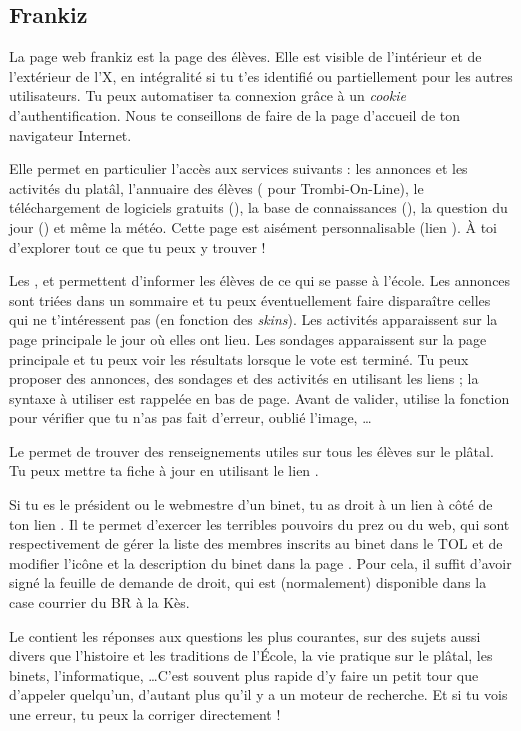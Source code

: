 \subsection{Frankiz}
\label{frankiz} La page web frankiz est la page des élèves. Elle est visible de l'intérieur et de
l'extérieur de l'X, en intégralité si tu t'es identifié ou partiellement pour les autres
utilisateurs. Tu peux automatiser ta connexion grâce à un \emph{cookie} d'authentification. Nous te
conseillons de faire de  la page d'accueil de ton navigateur Internet.

Elle permet en particulier l'accès aux services suivants : les
annonces et les activités du platâl, l'annuaire des élèves
( pour Trombi-On-Line), le téléchargement de logiciels
gratuits (), la base de connaissances (),
la question du jour () et même la météo. Cette page est
aisément personnalisable (lien ). À toi d'explorer
tout ce que tu peux y trouver !

Les ,  et  permettent d'informer les élèves de ce qui se passe à l'école. Les annonces sont triées dans
un sommaire et tu peux éventuellement faire disparaître celles qui ne t'intéressent pas (en fonction des \emph{skins}). Les activités apparaissent
sur la page principale le jour où elles ont lieu. Les sondages apparaissent sur la page principale et tu peux voir les
résultats lorsque le vote est terminé. Tu peux proposer des annonces, des sondages et des activités en utilisant les liens ; la syntaxe à utiliser est
rappelée en bas de page. Avant de valider, utilise la fonction  pour vérifier que tu n'as pas fait d'erreur, oublié l'image, \dots

Le  permet de trouver des renseignements utiles sur
tous les élèves sur le plâtal. Tu peux mettre ta fiche à jour en
utilisant le lien .

Si tu es le président ou le webmestre d'un binet, tu as droit à un
lien  à c\^oté de ton lien .
Il te permet d'exercer les terribles pouvoirs du prez ou du web, qui
sont respectivement de gérer la liste des membres inscrits au binet
dans le TOL et de modifier l'ic\^one et la description du binet dans
la page . Pour cela, il suffit d'avoir signé la feuille
de demande de droit, qui est (normalement) disponible dans la case
courrier du BR à la Kès.

Le  contient les réponses aux questions les plus courantes, sur des sujets aussi divers que l'histoire et les traditions de l'\'Ecole, la
vie pratique sur le plâtal, les binets, l'informatique, \dots C'est souvent plus rapide d'y faire un petit tour que d'appeler quelqu'un, d'autant plus qu'il y a
un moteur de recherche. Et si tu vois une erreur, tu peux la corriger directement !

